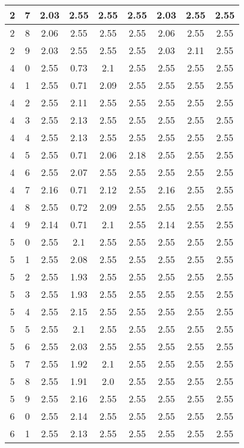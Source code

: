 \begin{longtable}{|c|c||c||c|c|c||c|c|c|}
	2 & 7 & 2.03 & 2.55 & 2.55 & 2.55 & 2.03 & 2.55 & 2.55 \\ \hline
	2 & 8 & 2.06 & 2.55 & 2.55 & 2.55 & 2.06 & 2.55 & 2.55 \\ \hline
	2 & 9 & 2.03 & 2.55 & 2.55 & 2.55 & 2.03 & 2.11 & 2.55 \\ \hline
	4 & 0 & 2.55 & 0.73 & 2.1 & 2.55 & 2.55 & 2.55 & 2.55 \\ \hline
	4 & 1 & 2.55 & 0.71 & 2.09 & 2.55 & 2.55 & 2.55 & 2.55 \\ \hline
	4 & 2 & 2.55 & 2.11 & 2.55 & 2.55 & 2.55 & 2.55 & 2.55 \\ \hline
	4 & 3 & 2.55 & 2.13 & 2.55 & 2.55 & 2.55 & 2.55 & 2.55 \\ \hline
	4 & 4 & 2.55 & 2.13 & 2.55 & 2.55 & 2.55 & 2.55 & 2.55 \\ \hline
	4 & 5 & 2.55 & 0.71 & 2.06 & 2.18 & 2.55 & 2.55 & 2.55 \\ \hline
	4 & 6 & 2.55 & 2.07 & 2.55 & 2.55 & 2.55 & 2.55 & 2.55 \\ \hline
	4 & 7 & 2.16 & 0.71 & 2.12 & 2.55 & 2.16 & 2.55 & 2.55 \\ \hline
	4 & 8 & 2.55 & 0.72 & 2.09 & 2.55 & 2.55 & 2.55 & 2.55 \\ \hline
	4 & 9 & 2.14 & 0.71 & 2.1 & 2.55 & 2.14 & 2.55 & 2.55 \\ \hline
	5 & 0 & 2.55 & 2.1 & 2.55 & 2.55 & 2.55 & 2.55 & 2.55 \\ \hline
	5 & 1 & 2.55 & 2.08 & 2.55 & 2.55 & 2.55 & 2.55 & 2.55 \\ \hline
	5 & 2 & 2.55 & 1.93 & 2.55 & 2.55 & 2.55 & 2.55 & 2.55 \\ \hline
	5 & 3 & 2.55 & 1.93 & 2.55 & 2.55 & 2.55 & 2.55 & 2.55 \\ \hline
	5 & 4 & 2.55 & 2.15 & 2.55 & 2.55 & 2.55 & 2.55 & 2.55 \\ \hline
	5 & 5 & 2.55 & 2.1 & 2.55 & 2.55 & 2.55 & 2.55 & 2.55 \\ \hline
	5 & 6 & 2.55 & 2.03 & 2.55 & 2.55 & 2.55 & 2.55 & 2.55 \\ \hline
	5 & 7 & 2.55 & 1.92 & 2.1 & 2.55 & 2.55 & 2.55 & 2.55 \\ \hline
	5 & 8 & 2.55 & 1.91 & 2.0 & 2.55 & 2.55 & 2.55 & 2.55 \\ \hline
	5 & 9 & 2.55 & 2.16 & 2.55 & 2.55 & 2.55 & 2.55 & 2.55 \\ \hline
	6 & 0 & 2.55 & 2.14 & 2.55 & 2.55 & 2.55 & 2.55 & 2.55 \\ \hline
	6 & 1 & 2.55 & 2.13 & 2.55 & 2.55 & 2.55 & 2.55 & 2.55 \\ \hline

\end{longtable}
